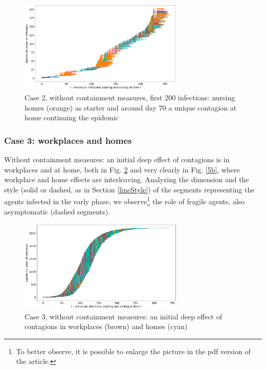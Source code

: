 \documentclass[11pt]{article}
\begin{document}
\begin{figure}[H]
\begin{center}
\includegraphics[width=0.7\textwidth]{no4b.png}%

\caption{Case 2, without containment measures, first 200 infections: nursing homes (orange) as starter and around day 70 a unique contagion at home continuing the epidemic}
\label{4b}
\end{center}
\end{figure}

\subsubsection{Case 3: workplaces and homes}
\label{c3}

Without containment measures: an initial deep effect of contagions is in workplaces and at home, both in Fig. \ref{5a} and very clearly in Fig. \ref{5b}, where workplace and home effects are interleaving. Analyzing the dimension and the style (solid or dashed, as in Section \ref{lineStyle}) of the segments representing the agents infected in the early phase, we observe\footnote{To better observe, it is possible to enlarge the picture in the pdf version of the article.} the role of fragile agents, also asymptomatic (dashed segments).



\begin{figure}[H]
\begin{center}
\includegraphics[width=0.7\textwidth]{no5a.png}%
\caption{Case 3, without containment measures: an initial deep effect of contagions in workplaces (brown) and homes (cyan)}
\label{5a}
\end{center}
\end{figure}
\end{document}
